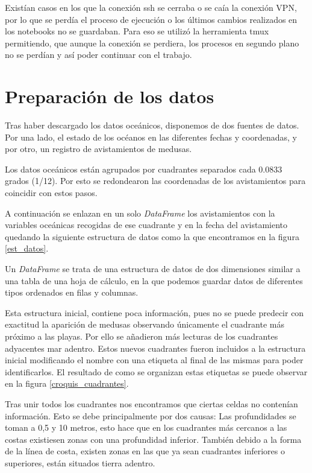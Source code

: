 Existían casos en los que la conexión ssh se cerraba o se caía la conexión VPN, por lo que se perdía el proceso de ejecución o los últimos cambios realizados en los notebooks no se guardaban. Para eso se utilizó la herramienta tmux permitiendo, que aunque la conexión se perdiera, los procesos en segundo plano no se perdían y así poder continuar con el trabajo.

\section{Preparación de los datos}\textsl{}
Tras haber descargado los datos oceánicos, disponemos de dos fuentes de datos. Por una lado, el estado de los océanos en las diferentes fechas y coordenadas, y por otro, un registro de avistamientos de medusas.

Los datos oceánicos están agrupados por cuadrantes separados cada \num{0,0833}  grados (1/12). Por esto se redondearon las coordenadas de los avistamientos para coincidir con estos pasos. 

A continuación se enlazan en un solo \emph{DataFrame} los avistamientos con la variables oceánicas recogidas de ese cuadrante y en la fecha del avistamiento quedando la siguiente estructura de datos como la que encontramos en la figura \ref{est_datos}.

Un \emph{DataFrame} se trata de una estructura de datos de dos dimensiones similar a una tabla de una hoja de cálculo, en la que podemos guardar datos de diferentes tipos ordenados en filas y columnas.

\label{est_datos}

Esta estructura inicial, contiene poca información, pues no se puede predecir con exactitud la aparición de medusas observando únicamente el cuadrante más próximo a las playas. Por ello se añadieron más lecturas de los cuadrantes adyacentes mar adentro. Estos nuevos cuadrantes fueron incluidos a la estructura inicial modificando el nombre con una etiqueta al final de las mismas para poder identificarlos. El resultado de como se organizan estas etiquetas se puede observar en la figura \ref{croquis_cuadrantes}.

\label{croquis_cuadrantes}

Tras unir todos los cuadrantes nos encontramos que ciertas celdas no contenían información. Esto se debe principalmente por dos causas: Las profundidades se toman a 0,5 y 10 metros, esto hace que en los cuadrantes más cercanos a las costas existiesen zonas con una profundidad inferior. También debido a la forma de la línea de costa, existen zonas en las que ya sean cuadrantes inferiores o superiores, están situados tierra adentro.

